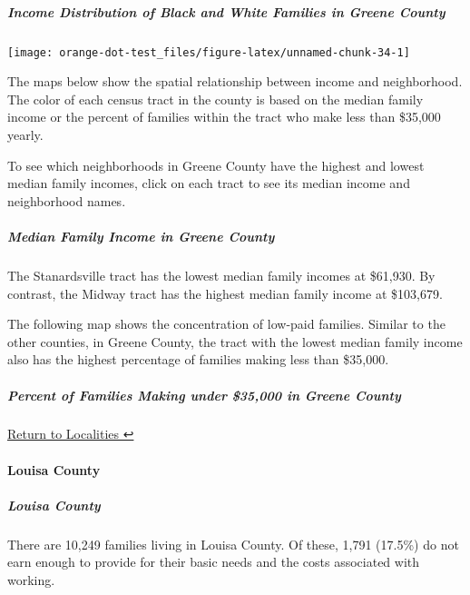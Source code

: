 \documentclass[
]{article}
\begin{document}
\hypertarget{income-distribution-of-black-and-white-families-in-greene-county}{%
\subparagraph{Income Distribution of Black and White Families in Greene
County}\label{income-distribution-of-black-and-white-families-in-greene-county}}

\begin{center}\texttt{[image: orange-dot-test\_files/figure-latex/unnamed-chunk-34-1]} \end{center}

The maps below show the spatial relationship between income and
neighborhood. The color of each census tract in the county is based on
the median family income or the percent of families within the tract who
make less than \$35,000 yearly.

To see which neighborhoods in Greene County have the highest and lowest
median family incomes, click on each tract to see its median income and
neighborhood names.

\hypertarget{median-family-income-in-greene-county}{%
\subparagraph{Median Family Income in Greene
County}\label{median-family-income-in-greene-county}}

The Stanardsville tract has the lowest median family incomes at
\$61,930. By contrast, the Midway tract has the highest median family
income at \$103,679.

The following map shows the concentration of low-paid families. Similar
to the other counties, in Greene County, the tract with the lowest
median family income also has the highest percentage of families making
less than \$35,000.

\hypertarget{percent-of-families-making-under-35000-in-greene-county}{%
\subparagraph{Percent of Families Making under \$35,000 in Greene
County}\label{percent-of-families-making-under-35000-in-greene-county}}

\protect\hyperlink{localities}{Return to Localities ↩︎}

\hypertarget{louisa-county}{%
\paragraph{Louisa County}\label{louisa-county}}

\hypertarget{louisa-county-1}{%
\subparagraph{Louisa County}\label{louisa-county-1}}

There are 10,249 families living in Louisa County. Of these, 1,791
(17.5\%) do not earn enough to provide for their basic needs and the
costs associated with working.
\end{document}
